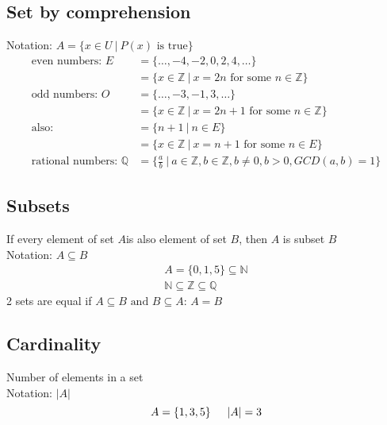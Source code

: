\documentclass{article}
\begin{document}
\subsection{Set by comprehension}
Notation: $A = \{x \in U \ | \ P(x) \text{ is true}\}$
\begin{align*}
    \text{even numbers: } E              & = \{\ldots, -4, -2,0,2,4,\dots \}                                                                                      \\
                                         & = \{x \in \mathbb{Z} \ | \ x = 2n \text{ for some } n \in \mathbb{Z} \}                                                \\
    \text{odd numbers: } O               & = \{\dots,-3,-1,3,\dots \}                                                                                             \\
                                         & = \{x \in \mathbb{Z} \ | \ x = 2n+1 \text{ for some } n \in \mathbb{Z} \}                                              \\
    \text{also: }                        & =  \{n+1 \ | \ n \in E \}                                                                                              \\
                                         & = \{x \in \mathbb{Z} \ | \ x = n+1 \text{ for some } n \in E \}                                                        \\
    \text{rational numbers: } \mathbb{Q} & = \{\frac{a}{b} \ | \ a \in \mathbb{Z}, b \in                             \mathbb{Z}, b \neq 0, b > 0, GCD(a,b) = 1 \}
\end{align*}

\subsection{Subsets}
If every element of set $A$is also element of set $B$, then $A$ is subset $B$ \\
Notation: $A \subseteq B$
\begin{gather*}
    A = \{0,1,5\} \subseteq \mathbb{N} \\
    \mathbb{N} \subseteq \mathbb{Z} \subseteq \mathbb{Q}
\end{gather*}
2 sets are equal if $A \subseteq B \text{ and } B \subseteq A$: $A = B$

\subsection{Cardinality}
Number of elements in a set \\
Notation: $\lvert A \rvert$
\[
    A = \{1,3,5\} \text{\indent } \lvert A \rvert = 3
\]
\end{document}
